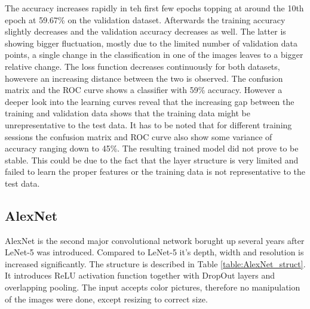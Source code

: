\documentclass[10pt, final]{article}
\begin{document}
The accuracy increases rapidly in teh first few epochs topping at around the 10th epoch at 59.67\% on the
validation dataset.
Afterwards the training accuracy slightly decreases and the validation accuracy decreases as well.
The latter is showing bigger fluctuation, mostly due to the limited number of validation data points, a single
change in the classification in one of the images leaves to a bigger relative change.
The loss function decreases continuously for both datasets, howevere an increasing distance between the two
is observed.
The confusion matrix and the ROC curve shows a classifier with 59\% accuracy.
However a deeper look into the learning curves reveal that the increasing gap between the training and validation
data shows that the training data might be unrepresentative to the test data.
It has to be noted that for different training sessions the confusion matrix and ROC curve also show some
variance of accuracy ranging down to 45\%.
The resulting trained model did not prove to be stable.
This could be due to the fact that the layer structure is very limited and failed to learn the proper features
or the training data is not representative to the test data.

\subsection{AlexNet} \label{sec:AlexNet}
AlexNet is the second major convolutional network borught up several years after LeNet-5 was introduced.
Compared to LeNet-5 it's depth, width and resolution is increased significantly.
The structure is described in Table \ref{table:AlexNet_struct}.
It introduces ReLU activation function together with DropOut layers and overlapping pooling.
The input accepts color pictures, therefore no manipulation of the images were done, except resizing to
correct size.
\end{document}
